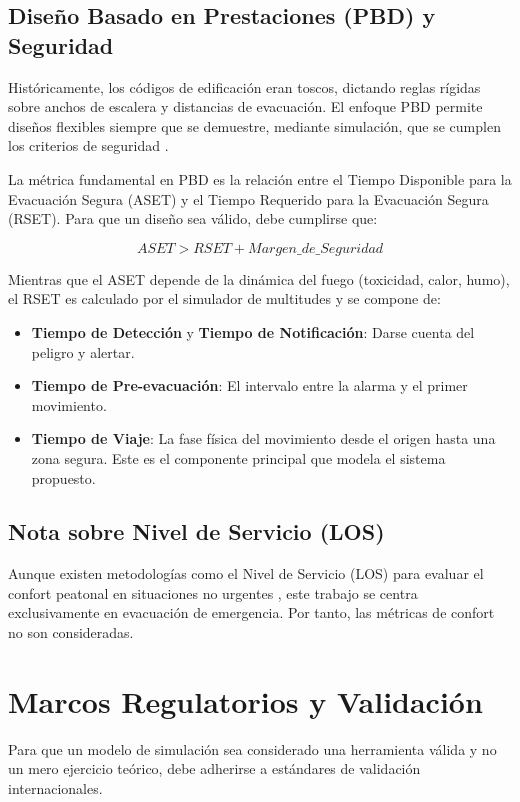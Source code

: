 \documentclass[11pt,spanish,listoffigures,listoftables]{tfgetsinf}
\begin{document}
\subsection{Diseño Basado en Prestaciones (PBD) y Seguridad}
Históricamente, los códigos de edificación eran toscos, dictando reglas rígidas sobre anchos de escalera y distancias de evacuación. El enfoque PBD permite diseños flexibles siempre que se demuestre, mediante simulación, que se cumplen los criterios de seguridad \cite{hurley-2015}.

La métrica fundamental en PBD es la relación entre el Tiempo Disponible para la Evacuación Segura (ASET) y el Tiempo Requerido para la Evacuación Segura (RSET). Para que un diseño sea válido, debe cumplirse que:

\begin{equation}
    ASET > RSET + Margen\_de\_Seguridad
\end{equation}

Mientras que el ASET depende de la dinámica del fuego (toxicidad, calor, humo), el RSET es calculado por el simulador de multitudes y se compone de:
\begin{itemize}
    \item \textbf{Tiempo de Detección} y \textbf{Tiempo de Notificación}: Darse cuenta del peligro y alertar. 
    \item \textbf{Tiempo de Pre-evacuación}: El intervalo entre la alarma y el primer movimiento.
    \item \textbf{Tiempo de Viaje}: La fase física del movimiento desde el origen hasta una zona segura. Este es el componente principal que modela el sistema propuesto.
\end{itemize}

\subsection{Nota sobre Nivel de Servicio (LOS)}
Aunque existen metodologías como el Nivel de Servicio (LOS) para evaluar el confort peatonal en situaciones no urgentes \cite{unknown-author-no-dateA}, este trabajo se centra exclusivamente en evacuación de emergencia. Por tanto, las métricas de confort no son consideradas.
\section{Marcos Regulatorios y Validación}

Para que un modelo de simulación sea considerado una herramienta válida y no un mero ejercicio teórico, debe adherirse a estándares de validación internacionales.
\end{document}
